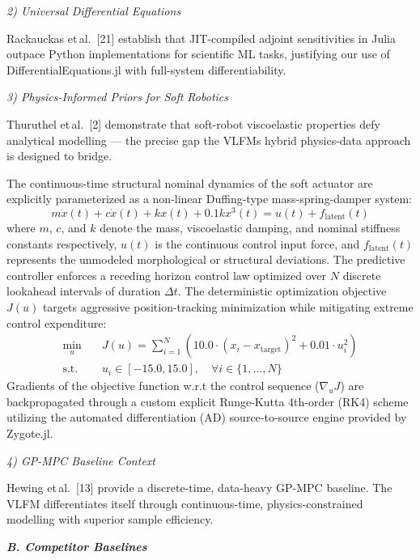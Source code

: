 \documentclass[letterpaper, 10pt, journal, twoside]{IEEEtran}
\begin{document}
\emph{2) Universal Differential Equations}

Rackauckas et\,al.~{[}21{]} establish that JIT-compiled adjoint
sensitivities in Julia outpace Python implementations for scientific ML
tasks, justifying our use of DifferentialEquations.jl with full-system
differentiability.

\emph{3) Physics-Informed Priors for Soft Robotics}

Thuruthel et\,al.~{[}2{]} demonstrate that soft-robot viscoelastic
properties defy analytical modelling --- the precise gap the
VLFM\textquotesingle s hybrid physics-data approach is designed to
bridge.

The continuous-time structural nominal dynamics of the soft actuator are explicitly parameterized as a non-linear Duffing-type mass-spring-damper system:
\begin{equation}
m\ddot{x}(t) + c\dot{x}(t) + kx(t) + 0.1kx^3(t) = u(t) + f_{\text{latent}}(t)
\label{eq:system_dynamics}
\end{equation}
where $m$, $c$, and $k$ denote the mass, viscoelastic damping, and nominal stiffness constants respectively, $u(t)$ is the continuous control input force, and $f_{\text{latent}}(t)$ represents the unmodeled morphological or structural deviations.
The predictive controller enforces a receding horizon control law optimized over $N$ discrete lookahead intervals of duration $\Delta t$. The deterministic optimization objective $J(u)$ targets aggressive position-tracking minimization while mitigating extreme control expenditure:
\begin{align}
\min_{u} \quad & J(u) = \sum_{i=1}^{N} \left( 10.0 \cdot (x_i - x_{\text{target}})^2 + 0.01 \cdot u_i^2 \right) \label{eq:mpc_objective} \\
\text{s.t.} \quad & u_i \in [-15.0, 15.0], \quad \forall i \in \{1, \dots, N\} \label{eq:mpc_constraints}
\end{align}
Gradients of the objective function w.r.t the control sequence ($\nabla_u J$) are backpropagated through a custom explicit Runge-Kutta 4th-order (RK4) scheme utilizing the automated differentiation (AD) source-to-source engine provided by Zygote.jl.

\emph{4) GP-MPC Baseline Context}

Hewing et\,al.~{[}13{]} provide a discrete-time, data-heavy GP-MPC
baseline. The VLFM differentiates itself through continuous-time,
physics-constrained modelling with superior sample efficiency.

\emph{\textbf{B. Competitor Baselines}}
\end{document}
